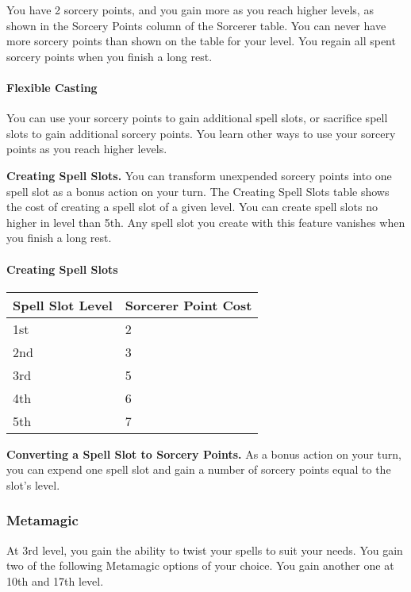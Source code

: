 \documentclass[
]{article}
\begin{document}
You have 2 sorcery points, and you gain more as you reach higher levels,
as shown in the Sorcery Points column of the Sorcerer table. You can
never have more sorcery points than shown on the table for your level.
You regain all spent sorcery points when you finish a long rest.

\hypertarget{flexible-casting}{%
\paragraph{Flexible Casting}\label{flexible-casting}}

You can use your sorcery points to gain additional spell slots, or
sacrifice spell slots to gain additional sorcery points. You learn other
ways to use your sorcery points as you reach higher levels.

\textbf{Creating Spell Slots.} You can transform unexpended sorcery
points into one spell slot as a bonus action on your turn. The Creating
Spell Slots table shows the cost of creating a spell slot of a given
level. You can create spell slots no higher in level than 5th. Any spell
slot you create with this feature vanishes when you finish a long rest.

\hypertarget{creating-spell-slots}{%
\paragraph{Creating Spell Slots}\label{creating-spell-slots}}

\begin{longtable}[]{@{}ll@{}}
\toprule
Spell Slot Level & Sorcerer Point Cost\tabularnewline
\midrule
\endhead
1st & 2\tabularnewline
2nd & 3\tabularnewline
3rd & 5\tabularnewline
4th & 6\tabularnewline
5th & 7\tabularnewline
\bottomrule
\end{longtable}

\textbf{Converting a Spell Slot to Sorcery Points.} As a bonus action on
your turn, you can expend one spell slot and gain a number of sorcery
points equal to the slot's level.

\hypertarget{metamagic}{%
\subsubsection{Metamagic}\label{metamagic}}

At 3rd level, you gain the ability to twist your spells to suit your
needs. You gain two of the following Metamagic options of your choice.
You gain another one at 10th and 17th level.
\end{document}
